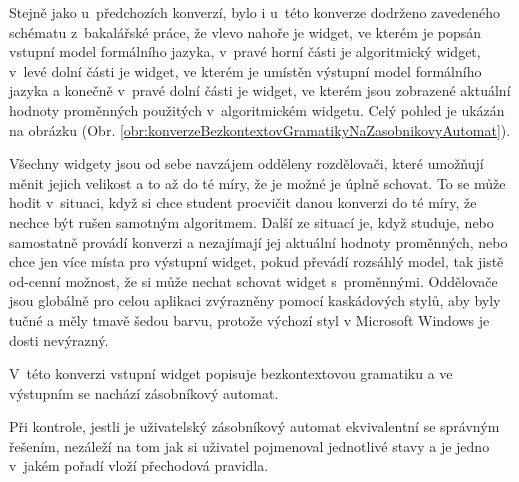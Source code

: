
Stejně jako u~předchozích konverzí, bylo i u~této konverze dodrženo zavedeného schématu z~bakalářské práce, že vlevo nahoře je widget, ve kterém je popsán vstupní model formálního jazyka, v~pravé horní části je algoritmický widget, v~levé dolní části je widget, ve kterém je umístěn výstupní model formálního jazyka a konečně v~pravé dolní části je widget, ve kterém jsou zobrazené aktuální hodnoty proměnných použitých v~algoritmickém widgetu. Celý pohled je ukázán na obrázku (Obr. \ref{obr:konverzeBezkontextovGramatikyNaZasobnikovyAutomat}). 

Všechny widgety jsou od sebe navzájem odděleny rozdělovači, které umožňují měnit jejich velikost a to až do té míry, že je možné je úplně schovat. To se může hodit v~situaci, když si chce student procvičit danou konverzi do té míry, že nechce být rušen samotným algoritmem. Další ze situací je, když studuje, nebo samostatně provádí konverzi a nezajímají jej aktuální hodnoty proměnných, nebo chce jen více místa pro výstupní widget, pokud převádí rozsáhlý model, tak jistě od-cenní možnost, že si může nechat schovat widget s~proměnnými. Oddělovače jsou globálně pro celou aplikaci zvýrazněny pomocí kaskádových stylů, aby byly tučné a měly tmavě šedou barvu, protože výchozí styl v Microsoft Windows je dosti nevýrazný.

V~této konverzi vstupní widget popisuje bezkontextovou gramatiku a ve výstupním se nachází zásobníkový automat.

Při kontrole, jestli je uživatelský zásobníkový automat ekvivalentní se správným řešením, nezáleží na tom jak si uživatel pojmenoval jednotlivé stavy a je jedno v~jakém pořadí vloží přechodová pravidla.



